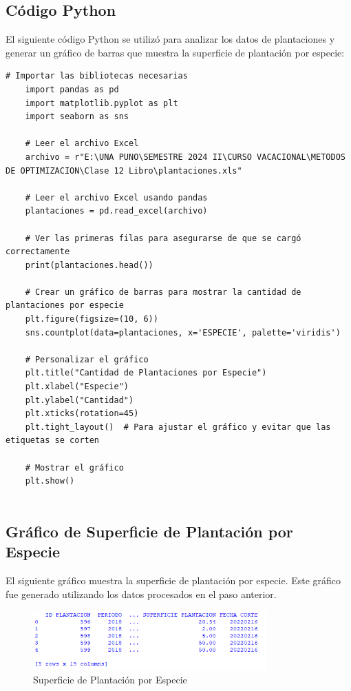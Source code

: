 \subsection{Código Python}
El siguiente código Python se utilizó para analizar los datos de plantaciones y generar un gráfico de barras que muestra la superficie de plantación por especie:

\begin{lstlisting}[style=python]
	# Importar las bibliotecas necesarias
	import pandas as pd
	import matplotlib.pyplot as plt
	import seaborn as sns
	
	# Leer el archivo Excel
	archivo = r"E:\UNA PUNO\SEMESTRE 2024 II\CURSO VACACIONAL\METODOS DE OPTIMIZACION\Clase 12 Libro\plantaciones.xls"
	
	# Leer el archivo Excel usando pandas
	plantaciones = pd.read_excel(archivo)
	
	# Ver las primeras filas para asegurarse de que se cargó correctamente
	print(plantaciones.head())
	
	# Crear un gráfico de barras para mostrar la cantidad de plantaciones por especie
	plt.figure(figsize=(10, 6))
	sns.countplot(data=plantaciones, x='ESPECIE', palette='viridis')
	
	# Personalizar el gráfico
	plt.title("Cantidad de Plantaciones por Especie")
	plt.xlabel("Especie")
	plt.ylabel("Cantidad")
	plt.xticks(rotation=45)
	plt.tight_layout()  # Para ajustar el gráfico y evitar que las etiquetas se corten
	
	# Mostrar el gráfico
	plt.show()
	
\end{lstlisting}

\subsection{Gráfico de Superficie de Plantación por Especie}
El siguiente gráfico muestra la superficie de plantación por especie. Este gráfico fue generado utilizando los datos procesados en el paso anterior.

\begin{figure}[H]
	\centering
	\includegraphics[width=0.8\textwidth]{IMAGEN 1.1.png} %
	\caption{Superficie de Plantación por Especie}
	\label{fig:superficie_especie}
\end{figure}

